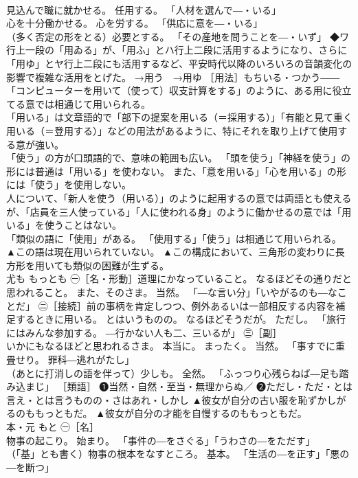 \documentclass[8pt]{extreport}
\begin{document}
\begin{CJK}{UTF8}{min}
\\	見込んで職に就かせる。 任用する。 「人材を選んで―・いる」 
\\	心を十分働かせる。 心を労する。 「供応に意を―・いる」 
\\	（多く否定の形をとる）必要とする。 「その産地を問うことを―・いず」 ◆ワ行上一段の「用ゐる」が、「用ふ」とハ行上二段に活用するようになり、さらに「用ゆ」とヤ行上二段にも活用するなど、平安時代以降のいろいろの音韻変化の影響で複雑な活用をとげた。 →用う　→用ゆ ［用法］もちいる・つかう――「コンピューターを用いて（使って）収支計算をする」のように、ある用に役立てる意では相通じて用いられる。 
\\	「用いる」は文章語的で「部下の提案を用いる（＝採用する）」「有能と見て重く用いる（＝登用する）」などの用法があるように、特にそれを取り上げて使用する意が強い。 
\\	「使う」の方が口頭語的で、意味の範囲も広い。 「頭を使う」「神経を使う」の形には普通は「用いる」を使わない。 また、「意を用いる」「心を用いる」の形には「使う」を使用しない。 
\\	人について、「新人を使う（用いる）」のように起用するの意では両語とも使えるが、「店員を三人使っている」「人に使われる身」のように働かせるの意では「用いる」を使うことはない。 
\\	「類似の語に「使用」がある。 「使用する」「使う」は相通じて用いられる。	▲この語は現在用いられていない。 ▲この構成において、三角形の変わりに長方形を用いても類似の困難が生ずる。
\\	尤も	もっとも	㊀［名・形動］道理にかなっていること。 なるほどその通りだと思われること。 また、そのさま。 当然。 「―な言い分」「いやがるのも―なことだ」 ㊁［接続］前の事柄を肯定しつつ、例外あるいは一部相反する内容を補足するときに用いる。 とはいうものの。 なるほどそうだが。 ただし。 「旅行にはみんな参加する。 ―行かない人も二、三いるが」 ㊂［副］ 
\\	いかにもなるほどと思われるさま。 本当に。 まったく。 当然。 「事すでに重畳せり。 罪科―逃れがたし」 
\\	（あとに打消しの語を伴って）少しも。 全然。 「ふっつり心残らねば―足も踏み込まじ」 ［類語］ ❶当然・自然・至当・無理からぬ／ ❷ただし・ただ・とは言え・とは言うものの・さはあれ・しかし	▲彼女が自分の古い服を恥ずかしがるのももっともだ。 ▲彼女が自分の才能を自慢するのももっともだ。
\\	本・元	もと	㊀［名］ 
\\	物事の起こり。 始まり。 「事件の―をさぐる」「うわさの―をただす」 
\\	（「基」とも書く）物事の根本をなすところ。 基本。 「生活の―を正す」「悪の―を断つ」 

\end{CJK}
\end{document}
